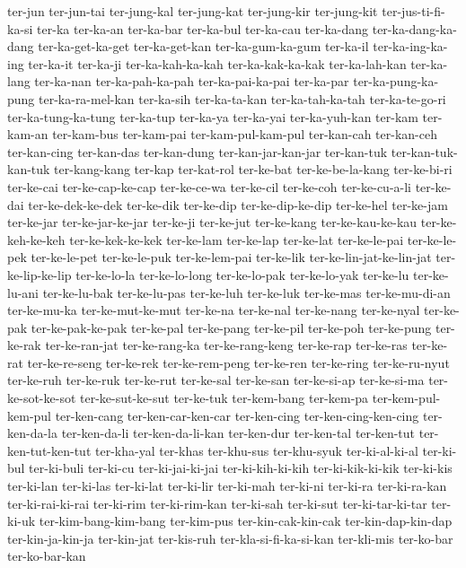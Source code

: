{ter-jun ter-jun-tai ter-jung-kal ter-jung-kat ter-jung-kir ter-jung-kit
ter-jus-ti-fi-ka-si ter-ka ter-ka-an ter-ka-bar ter-ka-bul ter-ka-cau
ter-ka-dang ter-ka-dang-ka-dang ter-ka-get-ka-get ter-ka-get-kan
ter-ka-gum-ka-gum ter-ka-il ter-ka-ing-ka-ing ter-ka-it ter-ka-ji
ter-ka-kah-ka-kah ter-ka-kak-ka-kak ter-ka-lah-kan ter-ka-lang ter-ka-nan
ter-ka-pah-ka-pah ter-ka-pai-ka-pai ter-ka-par ter-ka-pung-ka-pung
ter-ka-ra-mel-kan ter-ka-sih ter-ka-ta-kan ter-ka-tah-ka-tah
ter-ka-te-go-ri ter-ka-tung-ka-tung ter-ka-tup ter-ka-ya ter-ka-yai
ter-ka-yuh-kan ter-kam ter-kam-an ter-kam-bus ter-kam-pai
ter-kam-pul-kam-pul ter-kan-cah ter-kan-ceh ter-kan-cing ter-kan-das
ter-kan-dung ter-kan-jar-kan-jar ter-kan-tuk ter-kan-tuk-kan-tuk
ter-kang-kang ter-kap ter-kat-rol ter-ke-bat ter-ke-be-la-kang
ter-ke-bi-ri ter-ke-cai ter-ke-cap-ke-cap ter-ke-ce-wa ter-ke-cil
ter-ke-coh ter-ke-cu-a-li ter-ke-dai ter-ke-dek-ke-dek ter-ke-dik
ter-ke-dip ter-ke-dip-ke-dip ter-ke-hel ter-ke-jam ter-ke-jar
ter-ke-jar-ke-jar ter-ke-ji ter-ke-jut ter-ke-kang ter-ke-kau-ke-kau
ter-ke-keh-ke-keh ter-ke-kek-ke-kek ter-ke-lam ter-ke-lap ter-ke-lat
ter-ke-le-pai ter-ke-le-pek ter-ke-le-pet ter-ke-le-puk ter-ke-lem-pai
ter-ke-lik ter-ke-lin-jat-ke-lin-jat ter-ke-lip-ke-lip ter-ke-lo-la
ter-ke-lo-long ter-ke-lo-pak ter-ke-lo-yak ter-ke-lu ter-ke-lu-ani
ter-ke-lu-bak ter-ke-lu-pas ter-ke-luh ter-ke-luk ter-ke-mas
ter-ke-mu-di-an ter-ke-mu-ka ter-ke-mut-ke-mut ter-ke-na ter-ke-nal
ter-ke-nang ter-ke-nyal ter-ke-pak ter-ke-pak-ke-pak ter-ke-pal
ter-ke-pang ter-ke-pil ter-ke-poh ter-ke-pung ter-ke-rak ter-ke-ran-jat
ter-ke-rang-ka ter-ke-rang-keng ter-ke-rap ter-ke-ras ter-ke-rat
ter-ke-re-seng ter-ke-rek ter-ke-rem-peng ter-ke-ren ter-ke-ring
ter-ke-ru-nyut ter-ke-ruh ter-ke-ruk ter-ke-rut ter-ke-sal ter-ke-san
ter-ke-si-ap ter-ke-si-ma ter-ke-sot-ke-sot ter-ke-sut-ke-sut ter-ke-tuk
ter-kem-bang ter-kem-pa ter-kem-pul-kem-pul ter-ken-cang
ter-ken-car-ken-car ter-ken-cing ter-ken-cing-ken-cing ter-ken-da-la
ter-ken-da-li ter-ken-da-li-kan ter-ken-dur ter-ken-tal ter-ken-tut
ter-ken-tut-ken-tut ter-kha-yal ter-khas ter-khu-sus ter-khu-syuk
ter-ki-al-ki-al ter-ki-bul ter-ki-buli ter-ki-cu ter-ki-jai-ki-jai
ter-ki-kih-ki-kih ter-ki-kik-ki-kik ter-ki-kis ter-ki-lan ter-ki-las
ter-ki-lat ter-ki-lir ter-ki-mah ter-ki-ni ter-ki-ra ter-ki-ra-kan
ter-ki-rai-ki-rai ter-ki-rim ter-ki-rim-kan ter-ki-sah ter-ki-sut
ter-ki-tar-ki-tar ter-ki-uk ter-kim-bang-kim-bang ter-kim-pus
ter-kin-cak-kin-cak ter-kin-dap-kin-dap ter-kin-ja-kin-ja ter-kin-jat
ter-kis-ruh ter-kla-si-fi-ka-si-kan ter-kli-mis ter-ko-bar ter-ko-bar-kan
}
